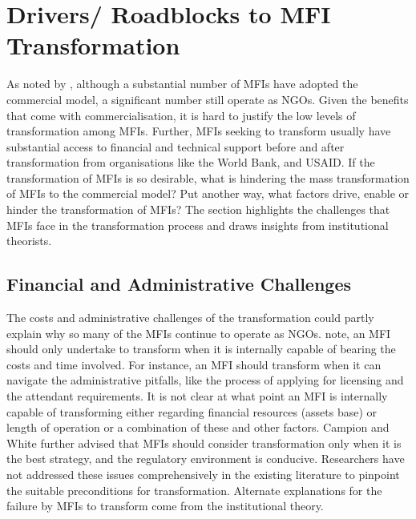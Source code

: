 \documentclass[a4paper,nobind]{templates/ociamthesis}
\begin{document}
\hypertarget{drivers-roadblocks-to-mfi-transformation}{%
\section{Drivers/ Roadblocks to MFI Transformation}\label{drivers-roadblocks-to-mfi-transformation}}

\noindent As noted by \textcite{d2017ngos}, although a substantial number of MFIs have adopted the commercial model, a significant number still operate as NGOs. Given the benefits that come with commercialisation, it is hard to justify the low levels of transformation among MFIs. Further, MFIs seeking to transform usually have substantial access to financial and technical support before and after transformation \autocite{bateman2010doesn,campion1999institutional} from organisations like the World Bank, and USAID. If the transformation of MFIs is so desirable, what is hindering the mass transformation of MFIs to the commercial model? Put another way, what factors drive, enable or hinder the transformation of MFIs? The section highlights the challenges that MFIs face in the transformation process and draws insights from institutional theorists.

\hypertarget{financial-and-administrative-challenges}{%
\subsection{Financial and Administrative Challenges}\label{financial-and-administrative-challenges}}

\noindent The costs and administrative challenges of the transformation could partly explain why so many of the MFIs continue to operate as NGOs. \textcite{campion1999institutional} note, an MFI should only undertake to transform when it is internally capable of bearing the costs and time involved. For instance, an MFI should transform when it can navigate the administrative pitfalls, like the process of applying for licensing and the attendant requirements. It is not clear at what point an MFI is internally capable of transforming either regarding financial resources (assets base) or length of operation or a combination of these and other factors. Campion and White further advised that MFIs should consider transformation only when it is the best strategy, and the regulatory environment is conducive. Researchers have not addressed these issues comprehensively in the existing literature to pinpoint the suitable preconditions for transformation. Alternate explanations for the failure by MFIs to transform come from the institutional theory.
\end{document}
